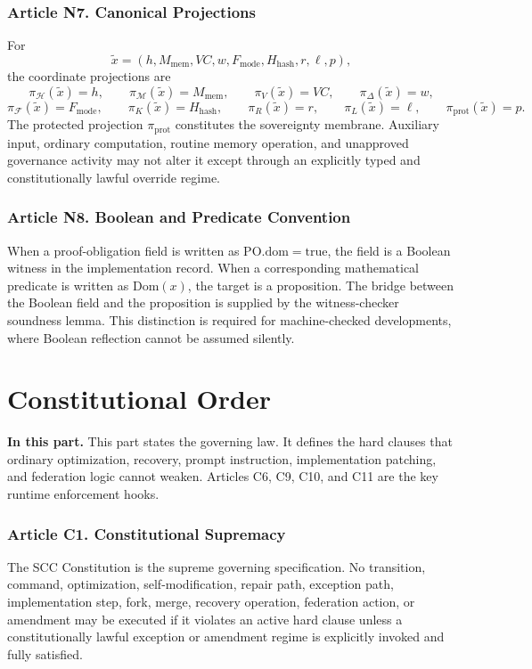 \documentclass[10pt,oneside]{article}
\theoremstyle{definition}
\theoremstyle{remark}
\newcommand{\PO}{\mathrm{PO}}
\newcommand{\prot}{\mathrm{prot}}
\newcommand{\mem}{\mathrm{mem}}
\newcommand{\hash}{\mathrm{hash}}
\newcommand{\mode}{\mathrm{mode}}
\newcommand{\dom}{\mathrm{dom}}
\newcommand{\PartIntro}[1]{\noindent\textbf{In this part.} #1\par\medskip}
\begin{document}
\section{Article N7. Canonical Projections}
For
\[
\widetilde{x}=(h,M_{\mem},VC,w,F_{\mode},H_{\hash},r,\ell,p),
\]
the coordinate projections are
\[
\pi_{\mathcal{H}}(\widetilde{x})=h,\qquad
\pi_{\mathcal{M}}(\widetilde{x})=M_{\mem},\qquad
\pi_V(\widetilde{x})=VC,\qquad
\pi_\Delta(\widetilde{x})=w,
\]
\[
\pi_{\mathcal{F}}(\widetilde{x})=F_{\mode},\qquad
\pi_K(\widetilde{x})=H_{\hash},\qquad
\pi_R(\widetilde{x})=r,\qquad
\pi_L(\widetilde{x})=\ell,\qquad
\pi_{\prot}(\widetilde{x})=p.
\]
The protected projection \(\pi_{\prot}\) constitutes the sovereignty membrane. Auxiliary input, ordinary computation, routine memory operation, and unapproved governance activity may not alter it except through an explicitly typed and constitutionally lawful override regime.

\section{Article N8. Boolean and Predicate Convention}
When a proof-obligation field is written as \(\PO.\dom=\mathrm{true}\), the field is a Boolean witness in the implementation record. When a corresponding mathematical predicate is written as \(\mathrm{Dom}(x)\), the target is a proposition. The bridge between the Boolean field and the proposition is supplied by the witness-checker soundness lemma. This distinction is required for machine-checked developments, where Boolean reflection cannot be assumed silently.

\part{Constitutional Order}

\PartIntro{This part states the governing law. It defines the hard clauses that ordinary optimization, recovery, prompt instruction, implementation patching, and federation logic cannot weaken. Articles C6, C9, C10, and C11 are the key runtime enforcement hooks.}

\section{Article C1. Constitutional Supremacy}
The SCC Constitution is the supreme governing specification. No transition, command, optimization, self-modification, repair path, exception path, implementation step, fork, merge, recovery operation, federation action, or amendment may be executed if it violates an active hard clause unless a constitutionally lawful exception or amendment regime is explicitly invoked and fully satisfied.
\end{document}
